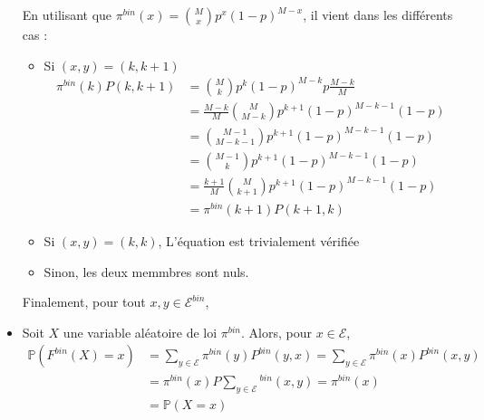 \documentclass[a4paper,11pt]{article}
\def \P{\mathbb{P}}
\def \E{\mathcal{E}}
\begin{document}
\begin{itemize}
En utilisant que $\pi^{bin}(x)  = \binom{M}{x}p^x(1-p)^{M-x}$, il vient dans les différents cas :

	\begin{itemize}
		\item 	Si $(x,y) = (k,k+1)$
			\begin{equation*}	
			\begin{split}
			\pi^{bin}(k)P(k,k+1) &= \binom{M}{k}p^k(1-p)^{M-k}p\frac{M-k}{M} \\
			&= \frac{M-k}{M}\binom{M}{M-k}p^{k+1}(1-p)^{M-k-1}(1-p)\\
			&= \binom{M-1}{M-k-1}p^{k+1}(1-p)^{M-k-1}(1-p)\\
			&= \binom{M-1}{k}p^{k+1}(1-p)^{M-k-1}(1-p)\\
			&= \frac{k+1}{M}\binom{M}{k+1}p^{k+1}(1-p)^{M-k-1}(1-p)\\
			&= \pi^{bin}(k+1)P(k+1,k) 
			\end{split}
			\end{equation*}
		\item   Si $(x,y) = (k,k)$, L'équation est trivialement vérifiée
		\item   Sinon, les deux memmbres sont nuls.
	\end{itemize}
		Finalement, pour tout $x,y \in \E^{bin}$, 
\begin{center}
\end{center}

\item[\textbullet]
Soit $X$ une variable aléatoire de loi $\pi^{bin}$. Alors, pour $x\in \E$,
\begin{equation*}
\begin{split}
 \P(F^{bin}(X)=x) &= \sum_{y\in\E}{\pi^{bin}(y)P^{bin}(y,x)}
		  = \sum_{y\in\E}{\pi^{bin}(x)P^{bin}(x,y)}\\
		  &= \pi^{bin}(x)P\sum_{y\in\E}{^{bin}(x,y)}
		  = \pi^{bin}(x)\\
		  &= \P(X=x) 
\end{split}
\end{equation*}
\begin{center}
\end{center}

\end{itemize}
\end{document}
